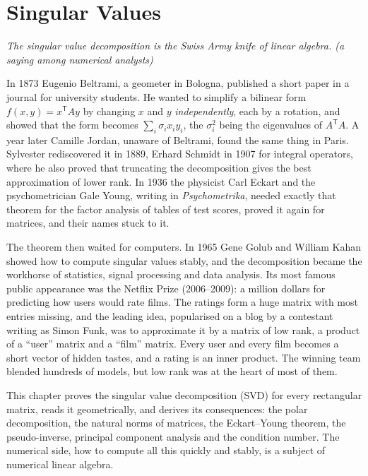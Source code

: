 \chapter{Singular Values}\label{linear:ch:svd}

\begin{center}\itshape
The singular value decomposition is the Swiss Army knife of linear algebra.
\upshape(a saying among numerical analysts)
\end{center}

In 1873 Eugenio Beltrami, a geometer in Bologna, published a short paper in a journal for university students. He wanted
to simplify a bilinear form $f(x,y)=x^{\mathsf T}Ay$ by changing $x$ and $y$ \emph{independently}, each by a rotation, and
showed that the form becomes $\sum_i\sigma_ix_iy_i$, the $\sigma_i^2$ being the eigenvalues of $A^{\mathsf T}A$. A year later
Camille Jordan, unaware of Beltrami, found the same thing in Paris. Sylvester rediscovered it in 1889, Erhard Schmidt in
1907 for integral operators, where he also proved that truncating the decomposition gives the best approximation of
lower rank. In 1936 the physicist Carl Eckart and the psychometrician Gale Young, writing in \emph{Psychometrika}, needed
exactly that theorem for the factor analysis of tables of test scores, proved it again for matrices, and their names
stuck to it.

The theorem then waited for computers. In 1965 Gene Golub and William Kahan showed how to compute singular values stably,
and the decomposition became the workhorse of statistics, signal processing and data analysis. Its most famous public
appearance was the Netflix Prize (2006--2009): a million dollars for predicting how users would rate films. The ratings
form a huge matrix with most entries missing, and the leading idea, popularised on a blog by a contestant writing as Simon
Funk, was to approximate it by a matrix of low rank, a product of a ``user'' matrix and a ``film'' matrix. Every user and
every film becomes a short vector of hidden tastes, and a rating is an inner product. The winning team blended hundreds of
models, but low rank was at the heart of most of them.

This chapter proves the singular value decomposition (SVD) for every rectangular matrix, reads it geometrically, and
derives its consequences: the polar decomposition, the natural norms of matrices, the Eckart--Young theorem, the
pseudo-inverse, principal component analysis and the condition number. The numerical side, how to compute all this
quickly and stably, is a subject of numerical linear algebra.

